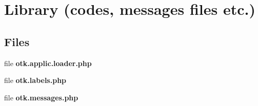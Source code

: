 \section{Library (codes, messages files etc.)}
\label{group__OTK__LIBRARY}
\subsection*{Files}
\begin{DoxyCompactItemize}
\item 
file {\bf otk.applic.loader.php}
\item 
file {\bf otk.labels.php}
\item 
file {\bf otk.messages.php}
\end{DoxyCompactItemize}

